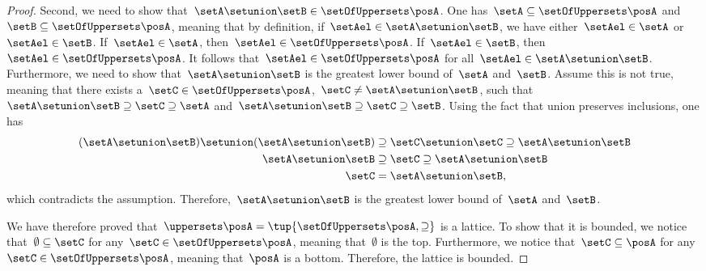 \begin{proof}
	Second, we need to show that~$\setA\setunion \setB\in \setOfUppersets \posA$.
	One has~$\setA\subseteq \setOfUppersets \posA$ and~$\setB \subseteq \setOfUppersets \posA$, meaning that by definition, if~$\setAel\in \setA\setunion \setB$, we have either~$\setAel\in \setA$ or~$\setAel\in \setB$.
	If~$\setAel\in \setA$, then~$\setAel\in \setOfUppersets \posA$.
	If~$\setAel\in \setB$, then~$\setAel \in \setOfUppersets \posA$.
	It follows that~$\setAel \in \setOfUppersets \posA$ for all~$\setAel\in \setA\setunion \setB$.
	Furthermore, we need to show that~$\setA\setunion \setB$ is the greatest lower bound of~$\setA$ and~$\setB$.
	Assume this is not true, meaning that there exists a~$\setC\in \setOfUppersets \posA$,~$\setC\neq \setA\setunion \setB$, such that~$\setA\setunion \setB\supseteq \setC\supseteq \setA$ and~$\setA\setunion \setB\supseteq \setC\supseteq \setB$.
	Using the fact that union preserves inclusions, one has
	\begin{equation}
		\begin{aligned}
			(\setA\setunion \setB)
			\setunion (\setA\setunion \setB) & \supseteq \setC \setunion \setC \supseteq \setA\setunion \setB \\
			\setA\setunion \setB        & \supseteq \setC\supseteq \setA\setunion \setB             \\
			\setC                  & =\setA\setunion \setB,
		\end{aligned}
	\end{equation}
	which contradicts the assumption.
	Therefore,~$\setA\setunion \setB$ is the greatest lower bound of~$\setA$ and~$\setB$.

	We have therefore proved that~$\uppersets \posA=\tup{\setOfUppersets \posA,\supseteq}$ is a lattice.
	To show that it is bounded, we notice that~$\emptyset \subseteq \setC$ for any~$\setC\in \setOfUppersets \posA$, meaning that~$\emptyset$ is the top.
	Furthermore, we notice that~$\setC\subseteq \posA$ for any~$\setC\in \setOfUppersets \posA$, meaning that~$\posA$ is a bottom.
	Therefore, the lattice is bounded.
\end{proof}

